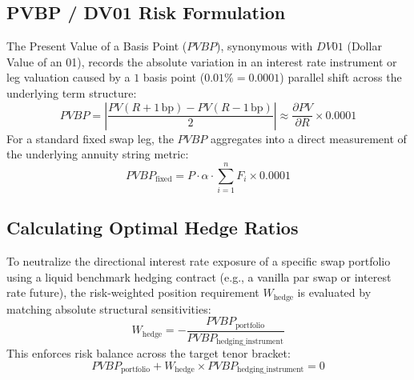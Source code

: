 \documentclass{article}
\begin{document}
\subsection{PVBP / DV01 Risk Formulation}
The Present Value of a Basis Point ($PVBP$), synonymous with $DV01$ (Dollar Value of an 01), records the absolute variation in an interest rate instrument or leg valuation caused by a $1$ basis point ($0.01\% = 0.0001$) parallel shift across the underlying term structure:
\begin{equation}
    PVBP = \left| \frac{PV(R + 1\,\text{bp}) - PV(R - 1\,\text{bp})}{2} \right| \approx \frac{\partial PV}{\partial R} \times 0.0001
\end{equation}
For a standard fixed swap leg, the $PVBP$ aggregates into a direct measurement of the underlying annuity string metric:
\begin{equation}
    PVBP_{\text{fixed}} = P \cdot \alpha \cdot \sum_{i=1}^n F_i \times 0.0001
\end{equation}

\subsection{Calculating Optimal Hedge Ratios}
To neutralize the directional interest rate exposure of a specific swap portfolio using a liquid benchmark hedging contract (e.g., a vanilla par swap or interest rate future), the risk-weighted position requirement $W_{\text{hedge}}$ is evaluated by matching absolute structural sensitivities:
\begin{equation}
    W_{\text{hedge}} = - \frac{PVBP_{\text{portfolio}}}{PVBP_{\text{hedging\_instrument}}}
\end{equation}
This enforces risk balance across the target tenor bracket:
\begin{equation}
    PVBP_{\text{portfolio}} + W_{\text{hedge}} \times PVBP_{\text{hedging\_instrument}} = 0
\end{equation}
\end{document}
